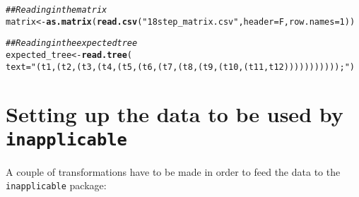 \documentclass{article}\usepackage[]{graphicx}\usepackage[]{color}
\makeatletter
\newcommand{\hlnum}[1]{\textcolor[rgb]{0.686,0.059,0.569}{#1}}%
\newcommand{\hlstr}[1]{\textcolor[rgb]{0.192,0.494,0.8}{#1}}%
\newcommand{\hlcom}[1]{\textcolor[rgb]{0.678,0.584,0.686}{\textit{#1}}}%
\newcommand{\hlstd}[1]{\textcolor[rgb]{0.345,0.345,0.345}{#1}}%
\newcommand{\hlkwb}[1]{\textcolor[rgb]{0.69,0.353,0.396}{#1}}%
\newcommand{\hlkwc}[1]{\textcolor[rgb]{0.333,0.667,0.333}{#1}}%
\newcommand{\hlkwd}[1]{\textcolor[rgb]{0.737,0.353,0.396}{\textbf{#1}}}%
\newenvironment{kframe}{%
 \def\at@end@of@kframe{}%
 \ifinner\ifhmode%
  \def\at@end@of@kframe{\end{minipage}}%
  \begin{minipage}{\columnwidth}%
 \fi\fi%
 \def\FrameCommand##1{\hskip\@totalleftmargin \hskip-\fboxsep
 \colorbox{shadecolor}{##1}\hskip-\fboxsep
     \hskip-\linewidth \hskip-\@totalleftmargin \hskip\columnwidth}%
 \MakeFramed {\advance\hsize-\width
   \@totalleftmargin\z@ \linewidth\hsize
   \@setminipage}}%
 {\par\unskip\endMakeFramed%
 \at@end@of@kframe}
\newenvironment{knitrout}{}{} %
\makeatother
\begin{document}
\begin{knitrout}
\color{fgcolor}\begin{kframe}
\begin{alltt}
\hlcom{## Reading in the matrix}
\hlstd{matrix} \hlkwb{<-} \hlkwd{as.matrix}\hlstd{(}\hlkwd{read.csv}\hlstd{(}\hlstr{"18step_matrix.csv"}\hlstd{,} \hlkwc{header} \hlstd{= F,} \hlkwc{row.names}\hlstd{=}\hlnum{1}\hlstd{))}

\hlcom{## Reading in the expected tree}
\hlstd{expected_tree} \hlkwb{<-} \hlkwd{read.tree}\hlstd{(}
    \hlkwc{text} \hlstd{=} \hlstr{"(t1,(t2,(t3,(t4,(t5,(t6,(t7,(t8,(t9,(t10,(t11,t12)))))))))));"}\hlstd{)}
\end{alltt}
\end{kframe}
\end{knitrout}


\section{Setting up the data to be used by \texttt{inapplicable}}

A couple of transformations have to be made in order to feed the data to the \texttt{inapplicable} package:
\end{document}
